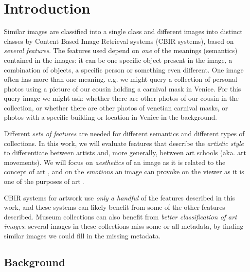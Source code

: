 \documentclass[11pt,a4paper,twoside,openright]{report}
\begin{document}
\newpage
\null
\thispagestyle{empty}
\newpage

\newpage
\setcounter{page}{1}

\chapter{Introduction}

Similar images are classified into a single class and different images into
distinct classes by Content Based Image Retrieval systems (CBIR systems), based
on \emph{several features}.  The features used depend on \emph{one} of the
meanings (semantics) contained in the images: it can be one specific object
present in the image, a combination of objects, a specific person or something
even different.  One image often has more than one meaning.  e.g. we might
query a collection of personal photos using a picture of our cousin holding a
carnival mask in Venice.  For this query image we might ask: whether there are
other photos of our cousin in the collection, or whether there are other photos
of venetian carnival masks, or photos with a specific building or location in
Venice in the background.

Different \emph{sets of features} are needed for different semantics and
different types of collections.  In this work, we will evaluate features that
describe the \emph{artistic style} to differentiate between artists and, more
generally, between art schools (aka. art movements).  We will focus on
\emph{aesthetics} of an image as it is related to the concept of art
\cite{rmc12ajs}, and on the \emph{emotions} an image can provoke on the viewer
as it is one of the purposes of art \cite{mach10clas}.

CBIR systems for artwork \cite{cfsp12air,isv12mpeg,ymvz03tree} use \emph{only a
handful} of the features described in this work, and these systems can likely
benefit from some of the other features described.  Museum collections can also
benefit from \emph{better classification of art images}:  several images in
these collections miss some or all metadata, by finding similar images we could
fill in the missing metadata.

\section{Background}
\end{document}
